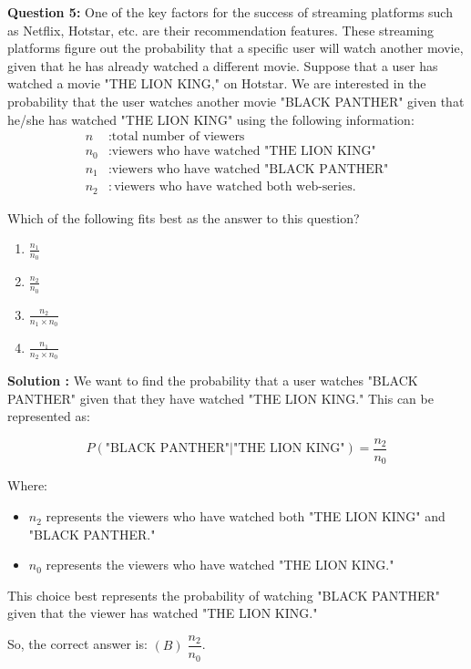 \documentclass[10pt]{article}
\begin{document}
\textbf{Question 5:} One of the key factors for the success of streaming platforms such as Netflix, Hotstar, etc. are their recommendation features. These streaming platforms figure out the probability that a specific user will watch another movie, given that he has already watched a different movie. Suppose that a user has watched a movie "THE LION KING," on Hotstar. We are interested in the probability that the user watches another movie "BLACK PANTHER" given that he/she has watched "THE LION KING" using the following information:
\begin{align*}
    n & : \text{total number of viewers} \\
    n_0 & : \text{viewers who have watched "THE LION KING"} \\
    n_1 & : \text{viewers who have watched "BLACK PANTHER"} \\
    n_2 & : \text{viewers who have watched both web-series}.
\end{align*}

Which of the following fits best as the answer to this question?

\begin{enumerate}[label = (\Alph*)]
    \item $\frac{n_1}{n_0}$
    \item $\frac{n_2}{n_0}$
    \item $\frac{n_2}{n_1 \times n_0}$
    \item $\frac{n_1}{n_2 \times n_0}$
\end{enumerate}

\textbf{Solution :} We want to find the probability that a user watches "BLACK PANTHER" given that they have watched "THE LION KING." This can be represented as:

\[ P(\text{"BLACK PANTHER"} | \text{"THE LION KING"}) = \frac{n_2}{n_0} \]

Where:
\begin{itemize}
    \item \( n_2 \) represents the viewers who have watched both "THE LION KING" and "BLACK PANTHER."
    \item \( n_0 \) represents the viewers who have watched "THE LION KING."
\end{itemize}
This choice best represents the probability of watching "BLACK PANTHER" given that the viewer has watched "THE LION KING."

So, the correct answer is:
$ (B) \; \dfrac{n_2}{n_0}$.
\\
\end{document}
